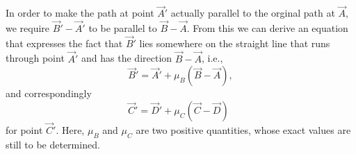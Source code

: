 In order to make the path at point $\vec{A}'$ actually parallel to the orginal
path at $\vec{A}$, we require $\vec{B}' - \vec{A}'$ to be parallel to $\vec{B}
- \vec{A}$. From this we can derive an equation that expresses the fact that
$\vec{B}'$ lies somewhere on the straight line that runs through point
$\vec{A}'$ and has the direction $\vec{B} - \vec{A}$, i.e.,
\begin{equation}
  \label{eq:eq3}
  \vec{B}' = \vec{A}' + \mu_B (\vec{B} - \vec{A}),
\end{equation}
and correspondingly
\begin{equation}
  \label{eq:eq4}
  \vec{C}' = \vec{D}' + \mu_C (\vec{C} - \vec{D})\phantom{,}
\end{equation}
for point $\vec{C}'$. Here, $\mu_B$ and $\mu_C$ are two positive quantities, whose
exact values are still to be determined.

